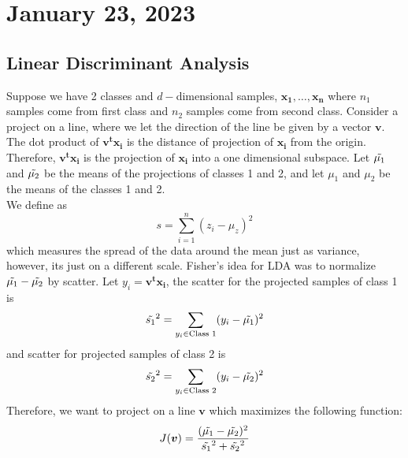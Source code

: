\section{January 23, 2023}
\subsection{Linear Discriminant Analysis}
Suppose we have 2 classes and  $d-$dimensional samples, $\boldsymbol{x_1, \dots, x_n}$ where $n_1$ samples come from first class and $n_2$ samples come from second class. 
Consider a project on a line, where we let the direction of the line be given by a vector
$\boldsymbol{v}$. The dot product of $\boldsymbol{v^tx_i}$ is the distance of projection 
of $\boldsymbol{x_i}$ from the origin. Therefore, $\boldsymbol{v^tx_i}$ is the projection of $\boldsymbol{x_i}$ into a one dimensional subspace.
Let  $\Tilde{\mu_1}$ and $\Tilde{\mu_2}$ be the means of the projections of classes 1 and 2, and let $\mu_1$ and $\mu_2$ be the means of the classes 1 and 2.
\\
We define  as 
$$
s = \sum_{i=1}^{n} (z_i - \mu_z)^2
$$
which measures the spread of the data around the mean just as variance, however, its just on a different scale. 
Fisher's idea for LDA was to normalize $\Tilde{\mu_1} - \Tilde{\mu_2}$ by scatter. 
Let $y_i = \boldsymbol{v^tx_i}$, the scatter for the projected samples of class 1 is 
$$
\Tilde{s_1}^2 =\sum_{y_i \in \text{Class 1}}(y_i - \Tilde{\mu_1})^2 
$$
and scatter for projected samples of class 2 is
$$
\Tilde{s_2}^2 =\sum_{y_i \in \text{Class 2}}(y_i - \Tilde{\mu_2})^2 
$$
Therefore, we want to project on a line $\boldsymbol{v}$ which maximizes the following function:
$$
J(\boldsymbol{v}) = \frac{(\Tilde{\mu_1} - \Tilde{\mu_2})^2}{\Tilde{s_1}^2  + \Tilde{s_2}^2}
$$
